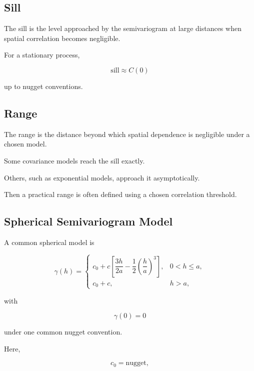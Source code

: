 \subsection{Sill}
\label{subsec:variogram-sill}

The sill is the level approached by the semivariogram at large distances
when spatial correlation becomes negligible.

For a stationary process,

\[
\boxed{
\text{sill}
\approx
C(0)
}
\]

up to nugget conventions.

\subsection{Range}
\label{subsec:variogram-range}

The range is the distance beyond which spatial dependence is negligible
under a chosen model.

Some covariance models reach the sill exactly.

Others, such as exponential models, approach it asymptotically.

Then a practical range is often defined using a chosen correlation
threshold.

\subsection{Spherical Semivariogram Model}
\label{subsec:spherical-semivariogram}

A common spherical model is

\[
\boxed{
\gamma(h)
=
\begin{cases}
c_0
+
c
\left[
\dfrac{3h}{2a}
-
\dfrac12
\left(
\dfrac{h}{a}
\right)^3
\right],
&
0<h\leq a,
\\[1em]
c_0+c,
&
h>a,
\end{cases}
}
\]

with

\[
\gamma(0)=0
\]

under one common nugget convention.

Here,

\[
c_0
=
\text{nugget},
\]

